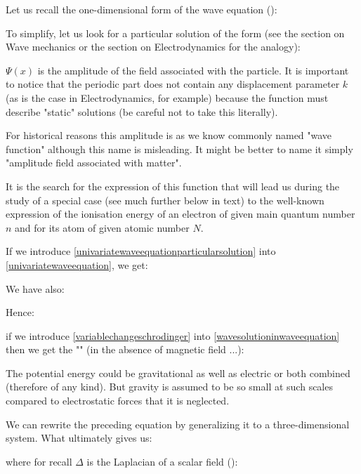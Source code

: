	Let us recall the one-dimensional form of the wave equation ():
	
	To simplify, let us look for a particular solution of the form (see the section on Wave mechanics or the section on Electrodynamics for the analogy):
	
	$\Psi(x)$ is the amplitude of the field associated with the particle. It is important to notice that the periodic part does not contain any displacement parameter $k$ (as is the case in Electrodynamics, for example) because the function must describe "static" solutions (be careful not to take this literally).
	
	For historical reasons this amplitude is as we know commonly named "wave function" although this name is misleading. It might be better to name it simply "amplitude field associated with matter".
	
	It is the search for the expression of this function that will lead us during the study of a special case (see much further below in text) to the well-known expression of the ionisation energy of an electron of given main quantum number $n$ and for its atom of given atomic number $N$.
	
	If we introduce \ref{univariatewaveequationparticularsolution} into \ref{univariatewaveequation}, we get:
	
	We have also:
	
	
	Hence:
	
	if we introduce \ref{variablechangeschrodinger} into \ref{wavesolutioninwaveequation} then we get the "\label{classical one dimensional schrodinger equation}" (in the absence of magnetic field ...):
	
	\begin{tcolorbox}[title=Remark,colframe=black,arc=10pt]
	The potential energy could be gravitational as well as electric or both combined (therefore of any kind). But gravity is assumed to be so small at such scales compared to electrostatic forces that it is neglected.
	\end{tcolorbox}
	We can rewrite the preceding equation by generalizing it to a three-dimensional system. What ultimately gives us:
	
	where for recall $\Delta$ is the Laplacian of a scalar field ():
	
